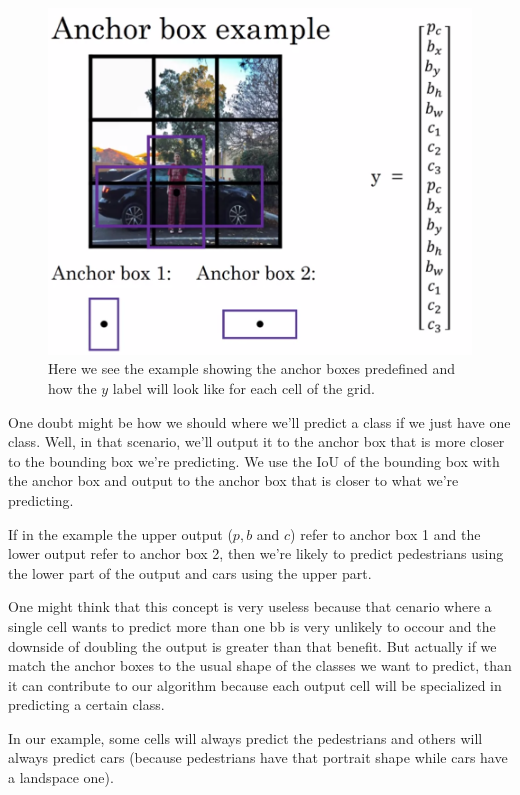 \documentclass[12pt, a4paper, oneside]{book}
\begin{document}
\begin{figure}[h]
\centering
\includegraphics[scale=0.4]{Res/anchor_box_example.png}
\caption{Here we see the example showing the anchor boxes predefined and how the
$y$ label will look like for each cell of the grid.}
\label{anchor_box_example.png}
\end{figure}

One doubt might be how we should where we'll predict a class if we just have one
class. Well, in that scenario, we'll output it to the anchor box that is more
closer to the bounding box we're predicting. We use the IoU of the bounding box
with the anchor box and output to the anchor box that is closer to what we're
predicting.

If in the example the upper output ($p, b$ and $c$) refer to anchor box 1 and
the lower output refer to anchor box 2, then we're likely to predict pedestrians
using the lower part of the output and cars using the upper part.

One might think that this concept is very useless because that cenario where a
single cell wants to predict more than one bb is very unlikely to occour and the
downside of doubling the output is greater than that benefit. But actually if we
match the anchor boxes to the usual shape of the classes we want to predict,
than it can contribute to our algorithm because each output cell will be
specialized in predicting a certain class.

In our example, some cells will always predict the pedestrians and others will
always predict cars (because pedestrians have that portrait shape while cars
have a landspace one).




\end{document}
